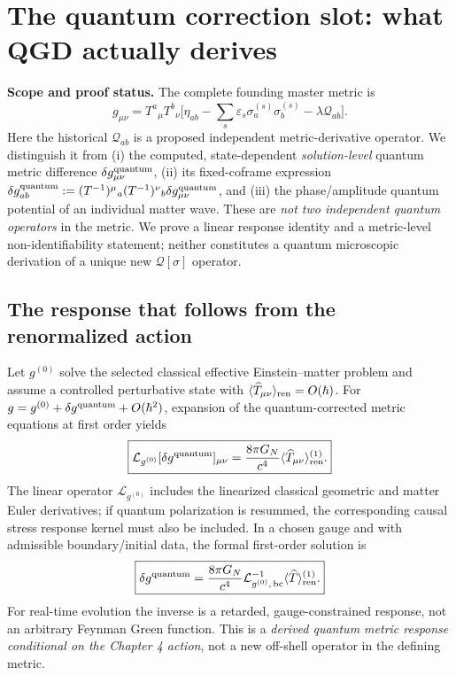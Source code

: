 \documentclass[11pt,a4paper]{article}
\theoremstyle{remark}\newtheorem{remark}[theorem]{Remark}
\begin{document}
\section{The quantum correction slot: what QGD actually derives}\label{sec:qgd138}
\noindent\textbf{Scope and proof status.} The complete founding master metric is
\begin{equation}\label{eq:qgd138-master}
 \boxed{g_{\mu\nu}=T^a{}_{\mu}T^b{}_{\nu}
 \biggl[\eta_{ab}-\sum_s\varepsilon_s\sigma_a^{(s)}\sigma_b^{(s)}
 -\lambda\mathcal Q_{ab}\biggr].}
\end{equation}
Here the historical $\mathcal Q_{ab}$ is a proposed independent
metric-derivative operator. We distinguish it from (i) the computed,
state-dependent \emph{solution-level} quantum metric difference
$\delta g_{\mu\nu}^{\rm quantum}$, (ii) its fixed-coframe expression
$\delta g_{ab}^{\rm quantum}:=(T^{-1})^\mu{}_a
(T^{-1})^\nu{}_b\delta g_{\mu\nu}^{\rm quantum}$, and
(iii) the phase/amplitude quantum potential of an individual matter wave.
These are \emph{not two independent quantum operators} in the metric.
We prove a linear response identity and a metric-level non-identifiability
statement; neither constitutes a quantum microscopic derivation of a
unique new $\mathcal Q[\sigma]$ operator.

\subsection{The response that follows from the renormalized action}
Let $g^{(0)}$ solve the selected classical effective Einstein--matter
problem and assume a controlled perturbative state with
$\langle\widehat T_{\mu\nu}\rangle_{\rm ren}=O(\hbar)$.
For $g=g^{(0)}+\delta g^{\rm quantum}+O(\hbar^2)$, expansion of the
quantum-corrected metric equations at first order yields
\begin{equation}\label{eq:qgd138-eom}
 \boxed{\mathcal L_{g^{(0)}}[\delta g^{\rm quantum}]_{\mu\nu}
 =\frac{8\pi G_N}{c^4}\langle\widehat T_{\mu\nu}\rangle_{\rm ren}^{(1)}.}
\end{equation}
The linear operator $\mathcal L_{g^{(0)}}$ includes the linearized
classical geometric and matter Euler derivatives; if quantum
polarization is resummed, the corresponding causal stress response
kernel must also be included. In a chosen gauge and with admissible
boundary/initial data, the formal first-order solution is
\begin{equation}\label{eq:qgd138-green}
 \boxed{\delta g^{\rm quantum}=\frac{8\pi G_N}{c^4}
 \mathcal L_{g^{(0)},\,\rm bc}^{-1}
 \langle\widehat T\rangle_{\rm ren}^{(1)}.}
\end{equation}
For real-time evolution the inverse is a retarded, gauge-constrained
response, not an arbitrary Feynman Green function. This is a
\emph{derived quantum metric response conditional on the Chapter 4 action},
not a new off-shell operator in the defining metric.
\end{document}

